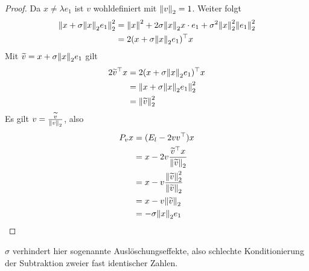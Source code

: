 \documentclass{report}
\begin{document}
\begin{proof}
	Da $x \neq \lambda e_1$ ist $v$ wohldefiniert mit $\norm{v}_2 = 1$. Weiter folgt
	\begin{align*}
		\norm{x + \sigma \norm{x}_2 e_1}_2^2 &= \norm{x}^2 + 2 \sigma\norm{x}_2 x \cdot e_1 + \sigma^2 \norm{x}_2^2 \norm{e_1}_2^2\\
		&= 2(x + \sigma \norm{x}_2 e_1)^\top x
	\end{align*}
	Mit $\widetilde v = x + \sigma \norm{x}_2 e_1$ gilt
	\begin{align*}
		2\widetilde v ^\top x &= 2(x + \sigma \norm{x}_2 e_1)^\top x\\
		&= \norm{x + \sigma \norm{x}_2 e_1}_2^2\\
		&= \norm{\widetilde v}^2_2
	\end{align*}
	Es gilt $v = \frac{\widetilde v}{\norm{v}_2}$, also
	\begin{align*}
		P_vx &= (E_l - 2vv^\top)x\\
		     &= x - 2v\frac{\widetilde v^\top x}{\norm{\widetilde v}_2}\\
		     &= x - v\frac{\norm{\widetilde v}_2^2}{\norm{\widetilde v}_2}\\
		     &= x - v\norm{\widetilde v}_2\\
		     &= - \sigma\norm{x}_2 e_1
	\end{align*}
\end{proof}
\noindent $\sigma$ verhindert hier sogenannte Auslöschungseffekte, also schlechte Konditionierung der Subtraktion zweier fast identischer Zahlen.
\end{document}
